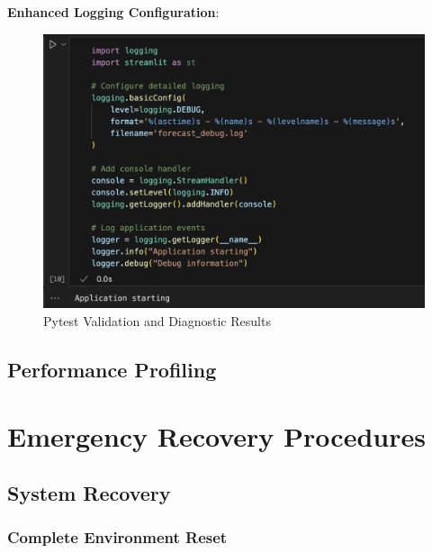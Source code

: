 \textbf{Enhanced Logging Configuration}:
\begin{figure}[H]
	\centering
		\includegraphics[width=1\textwidth]{Images/08Troubleshooting/Logging.png}
	\caption{Pytest Validation and Diagnostic Results}
	\label{fig:Logging}
\end{figure}

\subsection{Performance Profiling}

\section{Emergency Recovery Procedures}

\subsection{System Recovery}

\subsubsection{Complete Environment Reset}

